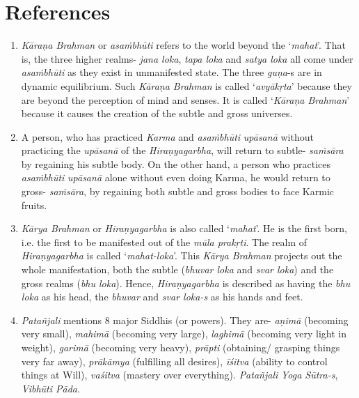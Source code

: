 \section*{References}

\begin{enumerate}
\item
  \emph{Kāraṇa Brahman} or \emph{asaṁbhūti} refers to the world beyond the `\emph{mahat}'. That is, the three higher realms- \emph{jana loka}, \emph{tapa loka} and \emph{satya loka} all come under \emph{asaṁbhūti} as they exist in unmanifested state. The three \emph{guṇa}-s are in dynamic equilibrium. Such \emph{Kāraṇa Brahman} is called `\emph{avyākṛta}' because they are beyond the perception of mind and senses. It is called `\emph{Kāraṇa Brahman}' because it causes the creation of the subtle and gross universes.
\item
  A person, who has practiced \emph{Karma} and \emph{asaṁbhūti} \emph{upāsanā} without practicing the \emph{upāsanā} of the \emph{Hiraṇyagarbha}, will return to subtle- \emph{saṁsāra} by regaining his subtle body. On the other hand, a person who practices \emph{asaṁbhūti} \emph{upāsanā} alone without even doing Karma, he would return to gross- \emph{saṁsāra}, by regaining both subtle and gross bodies to face Karmic fruits.
\item
  \emph{Kārya Brahman} or \emph{Hiraṇyagarbha} is also called `\emph{mahat}'. He is the first born, i.e. the first to be manifested out of the \emph{mūla prakṛti}. The realm of \emph{Hiraṇyagarbha} is called `\emph{mahat-loka}'. This \emph{Kārya Brahman} projects out the whole manifestation, both the subtle (\emph{bhuvar loka} and \emph{svar loka}) and the gross realms (\emph{bhu loka}). Hence, \emph{Hiraṇyagarbha} is described as having the \emph{bhu loka} as his head, the \emph{bhuvar} and \emph{svar loka-s} as his hands and feet.
\item
  \emph{Patañjali} mentions 8 major Siddhis (or powers). They are- \emph{aṇimā} (becoming very small), \emph{mahimā} (becoming very large), \emph{laghimā} (becoming very light in weight), \emph{garimā} (becoming very heavy), \emph{prāpti} (obtaining/ grasping things very far away), \emph{prākāmya} (fulfilling all desires), \emph{īśitva} (ability to control things at Will), \emph{vaśitva} (mastery over everything). \emph{Patañjali} \emph{Yoga Sūtra-s}, \emph{Vibhūti Pāda}.
\end{enumerate}

